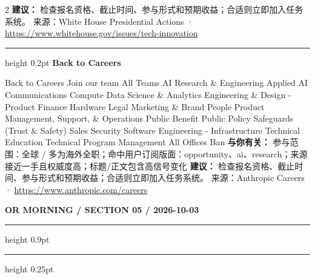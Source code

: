 \documentclass[10.5pt]{ctexart}
\begin{document}
\begin{multicols}{2}
\textbf{建议：} 检查报名资格、截止时间、参与形式和预期收益；合适则立即加入任务系统。
{\footnotesize\color{ormuted} 来源：White House Presidential Actions · \url{https://www.whitehouse.gov/issues/tech-innovation}}
\vspace{2mm}
\hrule height 0.2pt
\vspace{2mm}
{\large\bfseries Back to Careers}\par
Back to Careers Join our team All Teams AI Research \& Engineering Applied AI Communications Compute Data Science \& Analytics Engineering \& Design - Product Finance Hardware Legal Marketing \& Brand People Product Management, Support, \& Operations Public Benefit Public Policy Safeguards (Trust \& Safety) Sales Security Software Engineering - Infrastructure Technical Education Technical Program Management All Offices Ban
\textbf{与你有关：} 参与范围：全球 / 多为海外全职；命中用户订阅版面：opportunity、ai、research；来源接近一手且权威度高；标题/正文包含高信号变化
\textbf{建议：} 检查报名资格、截止时间、参与形式和预期收益；合适则立即加入任务系统。
{\footnotesize\color{ormuted} 来源：Anthropic Careers · \url{https://www.anthropic.com/careers}}
\end{multicols}
\newpage
{\small\bfseries OR MORNING / SECTION 05 / 2026-10-03}
\vspace{2mm}
\hrule height 0.9pt
\vspace{1.5mm}
\hrule height 0.25pt
\vspace{4mm}
\end{document}
